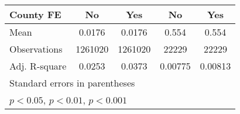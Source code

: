 \begin{table}[htbp]
{\begin{tabular}{l*{4}{c}}
            County FE                                      & No                             & Yes                            & No                                    & Yes                                   \\
            \midrule
            Mean                                           & 0.0176                         & 0.0176                         & 0.554                                 & 0.554                                 \\
            Observations                                   & 1261020                        & 1261020                        & 22229                                 & 22229                                 \\
            Adj. R-square                                  & 0.0253                         & 0.0373                         & 0.00775                               & 0.00813                               \\
            \bottomrule
            \multicolumn{5}{l}{\footnotesize Standard errors in parentheses}                                                                                                                                 \\
            \multicolumn{5}{l}{\footnotesize \sym{*} \(p<0.05\), \sym{**} \(p<0.01\), \sym{***} \(p<0.001\)}                                                                                                 \\
        \end{tabular}
    }
\end{table}
